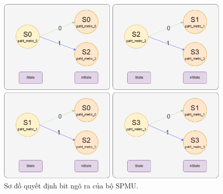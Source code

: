 \begin{figure}[H]
	\centering
	\includegraphics[width=.8\linewidth]{sections/pic/mophongbangSystemVerilog/spmu_trans.png}
	\caption{Sơ đồ quyết định bit ngõ ra của bộ SPMU.}
\end{figure}

